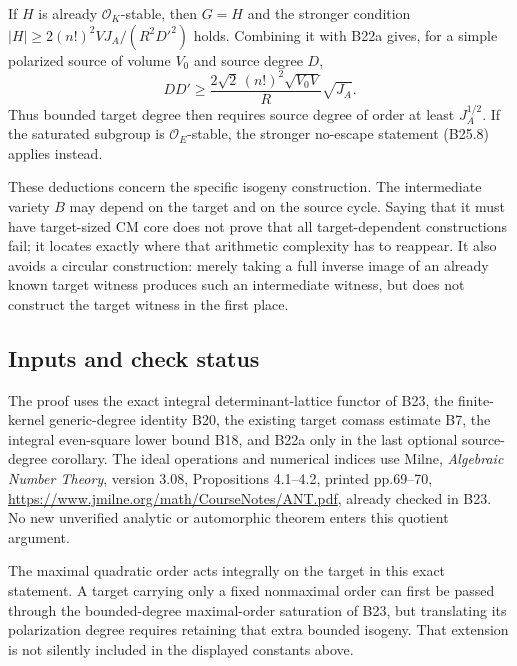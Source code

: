 If \(H\) is already \(\mathcal O_K\)-stable, then \(G=H\) and the stronger condition \(|H|\ge 2(n!)^2VJ_A/(R^2D'^2)\) holds. Combining it with B22a gives, for a simple polarized source of volume \(V_0\) and source degree \(D\), \[
 DD'\ge\frac{2\sqrt2\,(n!)^2\sqrt{V_0V}}{R}\sqrt{J_A}.
\tag{B25.13}
\] Thus bounded target degree then requires source degree of order at least \(J_A^{1/2}\). If the saturated subgroup is \(\mathcal O_E\)-stable, the stronger no-escape statement (B25.8) applies instead.

These deductions concern the specific isogeny construction. The intermediate variety \(B\) may depend on the target and on the source cycle. Saying that it must have target-sized CM core does not prove that all target-dependent constructions fail; it locates exactly where that arithmetic complexity has to reappear. It also avoids a circular construction: merely taking a full inverse image of an already known target witness produces such an intermediate witness, but does not construct the target witness in the first place.

\subsection{Inputs and check status}\label{inputs-and-check-status}

The proof uses the exact integral determinant-lattice functor of B23, the finite-kernel generic-degree identity B20, the existing target comass estimate B7, the integral even-square lower bound B18, and B22a only in the last optional source-degree corollary. The ideal operations and numerical indices use Milne, \emph{Algebraic Number Theory}, version 3.08, Propositions 4.1--4.2, printed pp.69--70, \url{https://www.jmilne.org/math/CourseNotes/ANT.pdf}, already checked in B23. No new unverified analytic or automorphic theorem enters this quotient argument.

The maximal quadratic order acts integrally on the target in this exact statement. A target carrying only a fixed nonmaximal order can first be passed through the bounded-degree maximal-order saturation of B23, but translating its polarization degree requires retaining that extra bounded isogeny. That extension is not silently included in the displayed constants above.
